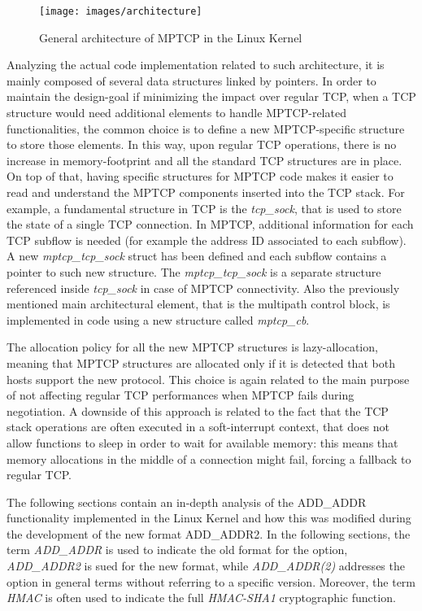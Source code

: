 \begin{figure}[!htb]
\centering
\texttt{[image: images/architecture]}
\caption{General architecture of MPTCP in the Linux Kernel}
\label{fig:architecture}
\end{figure}

Analyzing the actual code implementation related to such architecture, it is mainly composed of several data structures linked by pointers. In order to maintain the design-goal if minimizing the impact over regular TCP, when a TCP structure would need additional elements to handle MPTCP-related functionalities, the common choice is to define a new MPTCP-specific structure to store those elements. In this way, upon regular TCP operations, there is no increase in memory-footprint and all the standard TCP structures are in place. On top of that, having specific structures for MPTCP code makes it easier to read and understand the MPTCP components inserted into the TCP stack. For example, a fundamental structure in TCP is the \textit{tcp\_sock}, that is used to store the state of a single TCP connection. In MPTCP, additional information for each TCP subflow is needed (for example the address ID associated to each subflow). A new \textit{mptcp\_tcp\_sock} struct has been defined and each subflow contains a pointer to such new structure. The \textit{mptcp\_tcp\_sock} is a separate structure referenced inside \textit{tcp\_sock} in case of MPTCP connectivity.
Also the previously mentioned main architectural element, that is the multipath control block, is implemented in code using a new structure called \textit{mptcp\_cb}.

The allocation policy for all the new MPTCP structures is lazy-allocation, meaning that MPTCP structures are allocated only if it is detected that both hosts support the new protocol. This choice is again related to the main purpose of not affecting regular TCP performances when MPTCP fails during negotiation. A downside of this approach is related to the fact that the TCP stack operations are often executed in a soft-interrupt context, that does not allow functions to sleep in order to wait for available memory: this means that memory allocations in the middle of a connection might fail, forcing a fallback to regular TCP.

The following sections contain an in-depth analysis of the ADD\_ADDR functionality implemented in the Linux Kernel and how this was modified during the development of the new format ADD\_ADDR2. In the following sections, the term \textit{ADD\_ADDR} is used to indicate the old format for the option, \textit{ADD\_ADDR2} is sued for the new format, while \textit{ADD\_ADDR(2)} addresses the option in general terms without referring to a specific version. Moreover, the term \textit{HMAC} is often used to indicate the full \textit{HMAC-SHA1} cryptographic function.

